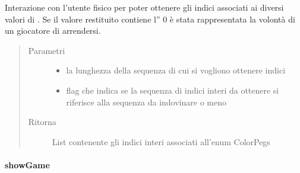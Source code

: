 \documentclass[letterpaper,10pt,italian,openany,oneside]{sphinxmanual}
\begin{document}
\begin{fulllineitems}
\label{\detokenize{test/it/unicam/cs/pa/mastermind/ui/GameView:it.unicam.cs.pa.mastermind.ui.GameView.getIndexSequence(int, boolean)}}
Interazione con l’utente fisico per poter ottenere gli indici associati ai diversi valori di . Se il valore restituito contiene l” 0 è stata rappresentata la volontà di un giocatore  di arrendersi.
\begin{quote}\begin{description}
\item[{Parametri}] \leavevmode\begin{itemize}
\item {} 
 \textendash{} la lunghezza della sequenza di cui si vogliono ottenere indici

\item {} 
 \textendash{} flag che indica se la sequenza di indici interi da ottenere si riferisce alla sequenza da indovinare o meno

\end{itemize}

\item[{Ritorna}] \leavevmode
List contenente gli indici interi associati all’enum ColorPegs

\end{description}\end{quote}

\end{fulllineitems}



\paragraph{showGame}
\label{\detokenize{test/it/unicam/cs/pa/mastermind/ui/GameView:showgame}}
\end{document}
